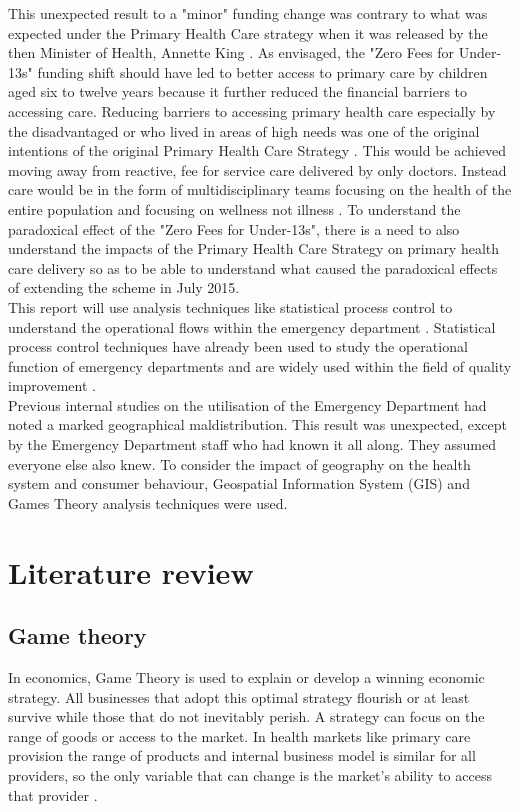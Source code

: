 \documentclass[11pt,a4paper]{article}
\begin{document}
This unexpected result to a "minor" funding change was contrary to what was expected under the Primary Health Care strategy when it was released by the then Minister of Health, Annette King \citep{king2001primary}. As envisaged, the "Zero Fees for Under-13s" funding shift should have led to better access to primary care by children aged six to twelve years because it further reduced the financial barriers to accessing care. Reducing barriers to accessing primary health care especially by the disadvantaged or who lived in areas of high needs was one of the original intentions of the original Primary Health Care Strategy \citep{king2001primary}. This would be achieved moving away from reactive, fee for service care delivered by only doctors. Instead care would be in the form of multidisciplinary teams focusing on the health of the entire population and focusing on wellness not illness \citep{king2001primary}.  To understand the paradoxical effect of the "Zero Fees for Under-13s", there is a need to also understand the impacts of the Primary Health Care Strategy on primary health care delivery so as to be able to understand what caused the paradoxical effects of extending the scheme in July 2015.\\


This report will use analysis techniques like statistical process control to understand the operational flows within the emergency department \citep{rosemann2015six, cheng2015run, epprecht2015statistical}. Statistical process control techniques have already been used to study the operational function of emergency departments \citep{pimentel2015statistical} and are widely used within the field of quality improvement \citep{provost2011health}.\\


Previous internal studies on the utilisation of the Emergency Department had noted a marked geographical maldistribution. This result was unexpected, except by the Emergency Department staff who had known it all along. They assumed everyone else also knew. To consider the impact of geography on the health system and consumer behaviour, Geospatial Information System (GIS) and Games Theory analysis techniques were used.\\


\section{Literature review}
\subsection{Game theory}
In economics, Game Theory is used to explain or develop a winning economic strategy. All businesses that adopt this optimal strategy flourish or at least survive while those that do not inevitably perish. A strategy can focus on the range of goods or access to the market. In health markets like primary care provision the range of products and internal business model is similar for  all providers, so the  only variable that can change is the market's ability to access that provider \citep{dinar2008game}. \\
\end{document}
